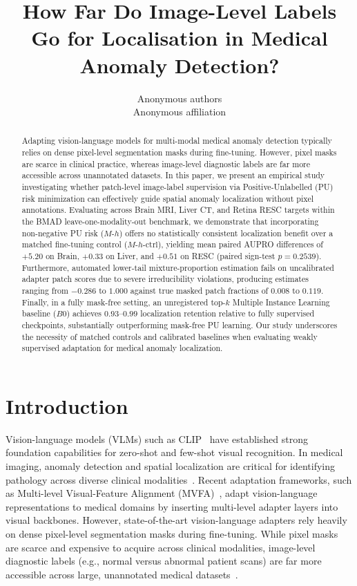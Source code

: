 \documentclass[10pt,twocolumn,letterpaper]{article}
\title{How Far Do Image-Level Labels Go for Localisation in Medical Anomaly Detection?}
\author{Anonymous authors\\Anonymous affiliation}
\begin{document}
\maketitle
\begin{abstract}
Adapting vision-language models for multi-modal medical anomaly detection typically relies on dense pixel-level segmentation masks during fine-tuning. However, pixel masks are scarce in clinical practice, whereas image-level diagnostic labels are far more accessible across unannotated datasets. In this paper, we present an empirical study investigating whether patch-level image-label supervision via Positive-Unlabelled (PU) risk minimization can effectively guide spatial anomaly localization without pixel annotations. Evaluating across Brain MRI, Liver CT, and Retina RESC targets within the BMAD leave-one-modality-out benchmark, we demonstrate that incorporating non-negative PU risk ($M\text{-}h$) offers no statistically consistent localization benefit over a matched fine-tuning control ($M\text{-}h\text{-ctrl}$), yielding mean paired AUPRO differences of $+5.20$ on Brain, $+0.33$ on Liver, and $+0.51$ on RESC (paired sign-test $p=0.2539$). Furthermore, automated lower-tail mixture-proportion estimation fails on uncalibrated adapter patch scores due to severe irreducibility violations, producing estimates ranging from $-0.286$ to $1.000$ against true masked patch fractions of $0.008$ to $0.119$. Finally, in a fully mask-free setting, an unregistered top-$k$ Multiple Instance Learning baseline ($B0$) achieves $0.93\text{--}0.99$ localization retention relative to fully supervised checkpoints, substantially outperforming mask-free PU learning. Our study underscores the necessity of matched controls and calibrated baselines when evaluating weakly supervised adaptation for medical anomaly localization.
\end{abstract}

\section{Introduction}
\label{sec:intro}
Vision-language models (VLMs) such as CLIP~\cite{clip2021} have established strong foundation capabilities for zero-shot and few-shot visual recognition. In medical imaging, anomaly detection and spatial localization are critical for identifying pathology across diverse clinical modalities~\cite{medicalad_survey2021}. Recent adaptation frameworks, such as Multi-level Visual-Feature Alignment (MVFA)~\cite{huang2024mvfa}, adapt vision-language representations to medical domains by inserting multi-level adapter layers into visual backbones. However, state-of-the-art vision-language adapters rely heavily on dense pixel-level segmentation masks during fine-tuning. While pixel masks are scarce and expensive to acquire across clinical modalities, image-level diagnostic labels (e.g., normal versus abnormal patient scans) are far more accessible across large, unannotated medical datasets~\cite{bmad2024}.
\end{document}
